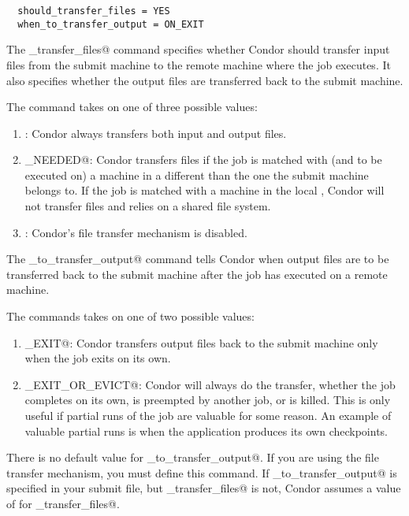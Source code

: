 \begin{verbatim}
  should_transfer_files = YES
  when_to_transfer_output = ON_EXIT
\end{verbatim}

The \verb@should_transfer_files@ command specifies
whether Condor should
transfer input files from the submit machine to the remote machine
where the job executes.
It also specifies whether the output files are transferred 
back to the submit machine.

The command takes on one of three possible values:
\begin{enumerate}

\item \verb@YES@: Condor always transfers both input and output files.

\item \verb@IF_NEEDED@: Condor transfers files if the job is
matched with (and to be executed on) a machine in a
different  than the
one the submit machine belongs to.
If the job is matched with a machine in the local ,
Condor will not transfer files and relies
on a shared file system.

\item \verb@NO@: Condor's file transfer mechanism is disabled. 

\end{enumerate}

The \verb@when_to_transfer_output@ command tells Condor when output
files are to be transferred back to the submit machine after the job
has executed on a remote machine.

The commands takes on one of two possible values:
\begin{enumerate}
\item \verb@ON_EXIT@: Condor transfers output files back to the submit
machine only when the job exits on its own.

\item \verb@ON_EXIT_OR_EVICT@: Condor will always do the transfer,
whether the job completes on its own, is preempted by another job, or
is killed.
This is only useful if partial runs of the job are valuable for some
reason. An example of valuable partial runs is when the application
produces its own checkpoints.
\end{enumerate}

There is no default value for \verb@when_to_transfer_output@.
If you are using the file transfer mechanism, you must define this
command.
If \verb@when_to_transfer_output@ is specified in your submit
file, but \verb@should_transfer_files@ is not, Condor assumes a
value of \verb@YES@ for \verb@should_transfer_files@.

